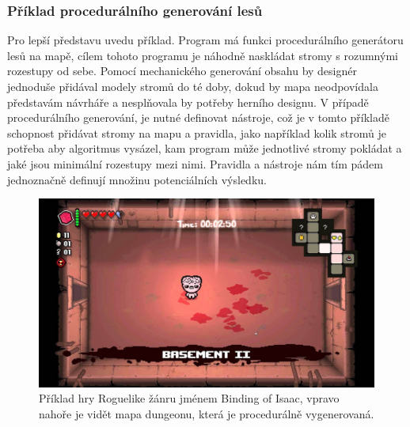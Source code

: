 \subsubsection{Příklad procedurálního generování lesů}
\label{proceduralExample}
Pro lepší představu uvedu příklad. Program má funkci procedurálního generátoru lesů na mapě, cílem tohoto programu je náhodně naskládat stromy s rozumnými rozestupy od sebe. Pomocí mechanického generování obsahu by designér jednoduše přidával modely stromů do té doby, dokud by mapa neodpovídala představám návrháře a nesplňovala by potřeby herního designu. V případě procedurálního generování, je nutné definovat nástroje, což je v tomto příkladě schopnost přidávat stromy na mapu a pravidla, jako například kolik stromů je potřeba aby algoritmus vysázel, kam program může jednotlivé stromy pokládat a jaké jsou minimální rozestupy mezi nimi. Pravidla a nástroje nám tím pádem jednoznačně definují množinu potenciálních výsledku.

\begin{figure}[h]
	\centering
	\includegraphics[scale=0.33]{obrazky-figures/BindingOfIsaac.jpg}
	\caption{Příklad hry Roguelike žánru jménem Binding of Isaac, vpravo nahoře je vidět mapa dungeonu, která je procedurálně vygenerovaná.}
\end{figure}

